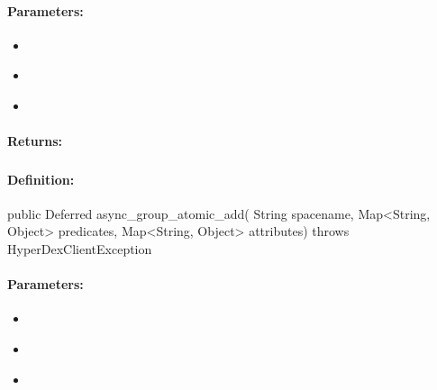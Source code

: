 \paragraph{Parameters:}
\begin{itemize}[noitemsep]
\item {}\\

\item {}\\

\item {}\\

\end{itemize}

\paragraph{Returns:}


\pagebreak
\subsubsection{}
\label{api:java:async_group_atomic_add}


\paragraph{Definition:}
\begin{javacode}
public Deferred async_group_atomic_add(
        String spacename,
        Map<String, Object> predicates,
        Map<String, Object> attributes) throws HyperDexClientException
\end{javacode}

\paragraph{Parameters:}
\begin{itemize}[noitemsep]
\item {}\\

\item {}\\

\item {}\\

\end{itemize}

